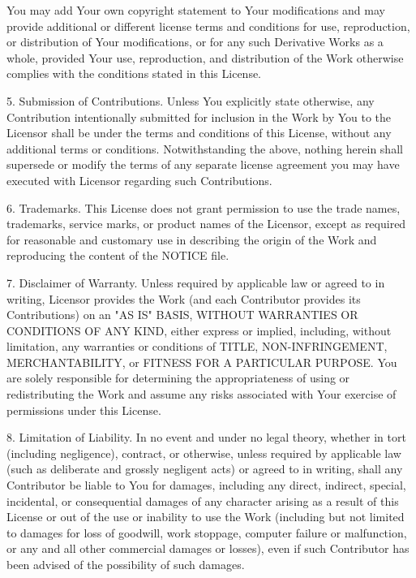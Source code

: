 \documentclass[twoside]{tceusermanual}
\begin{document}
      You may add Your own copyright statement to Your modifications and
      may provide additional or different license terms and conditions
      for use, reproduction, or distribution of Your modifications, or
      for any such Derivative Works as a whole, provided Your use,
      reproduction, and distribution of the Work otherwise complies with
      the conditions stated in this License.

   5. Submission of Contributions. Unless You explicitly state otherwise,
      any Contribution intentionally submitted for inclusion in the Work
      by You to the Licensor shall be under the terms and conditions of
      this License, without any additional terms or conditions.
      Notwithstanding the above, nothing herein shall supersede or modify
      the terms of any separate license agreement you may have executed
      with Licensor regarding such Contributions.

   6. Trademarks. This License does not grant permission to use the trade
      names, trademarks, service marks, or product names of the Licensor,
      except as required for reasonable and customary use in describing the
      origin of the Work and reproducing the content of the NOTICE file.

   7. Disclaimer of Warranty. Unless required by applicable law or
      agreed to in writing, Licensor provides the Work (and each
      Contributor provides its Contributions) on an "AS IS" BASIS,
      WITHOUT WARRANTIES OR CONDITIONS OF ANY KIND, either express or
      implied, including, without limitation, any warranties or conditions
      of TITLE, NON-INFRINGEMENT, MERCHANTABILITY, or FITNESS FOR A
      PARTICULAR PURPOSE. You are solely responsible for determining the
      appropriateness of using or redistributing the Work and assume any
      risks associated with Your exercise of permissions under this License.

   8. Limitation of Liability. In no event and under no legal theory,
      whether in tort (including negligence), contract, or otherwise,
      unless required by applicable law (such as deliberate and grossly
      negligent acts) or agreed to in writing, shall any Contributor be
      liable to You for damages, including any direct, indirect, special,
      incidental, or consequential damages of any character arising as a
      result of this License or out of the use or inability to use the
      Work (including but not limited to damages for loss of goodwill,
      work stoppage, computer failure or malfunction, or any and all
      other commercial damages or losses), even if such Contributor
      has been advised of the possibility of such damages.
\end{document}
